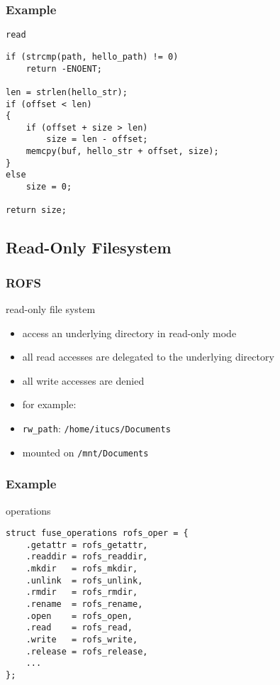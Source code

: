 \documentclass[dvipsnames]{beamer}
\begin{document}
\begin{frame}[fragile]
  \frametitle{Example}

  \begin{exampleblock}{\lstinline|read|}
    \begin{lstlisting}
if (strcmp(path, hello_path) != 0)
    return -ENOENT;

len = strlen(hello_str);
if (offset < len)
{
    if (offset + size > len)
        size = len - offset;
    memcpy(buf, hello_str + offset, size);
}
else
    size = 0;

return size;
    \end{lstlisting}
  \end{exampleblock}
\end{frame}

\subsection{Read-Only Filesystem}

\begin{frame}
  \frametitle{ROFS}

  \begin{exampleblock}{read-only file system}
    \begin{itemize}
      \item access an underlying directory in read-only mode
      \item all read accesses are delegated to the underlying directory
      \item all write accesses are denied

      \medskip
      \item for example:
      \item \lstinline|rw_path|: \texttt{/home/itucs/Documents}
      \item mounted on \texttt{/mnt/Documents}
    \end{itemize}
  \end{exampleblock}
\end{frame}

\begin{frame}[fragile]
  \frametitle{Example}

  \begin{exampleblock}{operations}
    \begin{lstlisting}
struct fuse_operations rofs_oper = {
    .getattr = rofs_getattr,
    .readdir = rofs_readdir,
    .mkdir   = rofs_mkdir,
    .unlink  = rofs_unlink,
    .rmdir   = rofs_rmdir,
    .rename  = rofs_rename,
    .open    = rofs_open,
    .read    = rofs_read,
    .write   = rofs_write,
    .release = rofs_release,
    ...
};
    \end{lstlisting}
  \end{exampleblock}
\end{frame}
\end{document}
